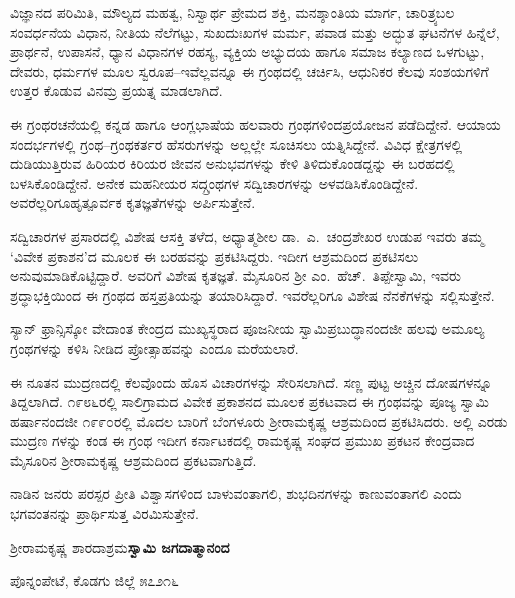 ವಿಜ್ಞಾನದ ಪರಿಮಿತಿ, ಮೌಲ್ಯದ ಮಹತ್ವ, ನಿಸ್ವಾರ್ಥ ಪ್ರೇಮದ ಶಕ್ತಿ, ಮನಶ್ಶಾಂತಿಯ ಮಾರ್ಗ, ಚಾರಿತ್ರ್ಯಬಲ ಸಂವರ್ಧನೆಯ ವಿಧಾನ, ನೀತಿಯ ನೆಲೆಗಟ್ಟು, ಸುಖದುಃಖಗಳ ಮರ್ಮ, ಪವಾಡ ಮತ್ತು ಅದ್ಭುತ ಘಟನೆಗಳ ಹಿನ್ನೆಲೆ, ಪ್ರಾರ್ಥನೆ, ಉಪಾಸನೆ, ಧ್ಯಾನ ವಿಧಾನಗಳ ರಹಸ್ಯ, ವ್ಯಕ್ತಿಯ ಅಭ್ಯುದಯ ಹಾಗೂ ಸಮಾಜ ಕಲ್ಯಾಣದ ಒಳಗುಟ್ಟು, ದೇವರು, ಧರ್ಮಗಳ ಮೂಲ ಸ್ವರೂಪ–ಇವೆಲ್ಲವನ್ನೂ ಈ ಗ್ರಂಥದಲ್ಲಿ ಚರ್ಚಿಸಿ, ಆಧುನಿಕರ ಕೆಲವು ಸಂಶಯಗಳಿಗೆ ಉತ್ತರ ಕೊಡುವ ವಿನಮ್ರ ಪ್ರಯತ್ನ ಮಾಡಲಾಗಿದೆ.

ಈ ಗ್ರಂಥರಚನೆಯಲ್ಲಿ ಕನ್ನಡ ಹಾಗೂ ಆಂಗ್ಲಭಾಷೆಯ ಹಲವಾರು ಗ್ರಂಥಗಳಿಂದ\break ಪ್ರಯೋಜನ ಪಡೆದಿದ್ದೇನೆ. ಆಯಾಯ ಸಂದರ್ಭಗಳಲ್ಲಿ ಗ್ರಂಥ–ಗ್ರಂಥಕರ್ತರ ಹೆಸರುಗಳನ್ನು ಅಲ್ಲಲ್ಲೇ ಸೂಚಿಸಲು ಯತ್ನಿಸಿದ್ದೇನೆ. ವಿವಿಧ ಕ್ಷೇತ್ರಗಳಲ್ಲಿ ದುಡಿಯುತ್ತಿರುವ ಹಿರಿಯರ ಕಿರಿಯರ ಜೀವನ ಅನುಭವಗಳನ್ನು ಕೇಳಿ ತಿಳಿದುಕೊಂಡದ್ದನ್ನು ಈ ಬರಹದಲ್ಲಿ ಬಳಸಿಕೊಂಡಿದ್ದೇನೆ. ಅನೇಕ ಮಹನೀಯರ ಸದ್ಗ್ರಂಥಗಳ ಸದ್ವಿಚಾರಗಳನ್ನು ಅಳವಡಿಸಿಕೊಂಡಿದ್ದೇನೆ. ಅವರೆಲ್ಲರಿಗೂ\break ಹೃತ್ಪೂರ್ವಕ ಕೃತಜ್ಞತೆಗಳನ್ನು ಅರ್ಪಿಸುತ್ತೇನೆ.

ಸದ್ವಿಚಾರಗಳ ಪ್ರಸಾರದಲ್ಲಿ ವಿಶೇಷ ಆಸಕ್ತಿ ತಳೆದ, ಅಧ್ಯಾತ್ಮಶೀಲ ಡಾ.\ ಎ.\ ಚಂದ್ರಶೇಖರ ಉಡುಪ ಇವರು ತಮ್ಮ ‘ವಿವೇಕ ಪ್ರಕಾಶನ’ದ ಮೂಲಕ ಈ ಬರಹವನ್ನು ಪ್ರಕಟಿಸಿದ್ದರು. ಇದೀಗ ಆಶ್ರಮದಿಂದ ಪ್ರಕಟಿಸಲು ಅನುವುಮಾಡಿಕೊಟ್ಟಿದ್ದಾರೆ. ಅವರಿಗೆ ವಿಶೇಷ ಕೃತಜ್ಞತೆ. ಮೈಸೂರಿನ ಶ‍್ರೀ ಎಂ.\ ಹೆಚ್.\ ತಿಪ್ಪೇಸ್ವಾಮಿ, ಇವರು ಶ್ರದ್ಧಾಭಕ್ತಿಯಿಂದ ಈ ಗ್ರಂಥದ ಹಸ್ತಪ್ರತಿಯನ್ನು ತಯಾರಿಸಿದ್ದಾರೆ. ಇವರೆಲ್ಲರಿಗೂ ವಿಶೇಷ ನೆನಕೆಗಳನ್ನು ಸಲ್ಲಿಸುತ್ತೇನೆ.

ಸ್ಯಾನ್ ಫ್ರಾನ್ಸಿಸ್ಕೋ ವೇದಾಂತ ಕೇಂದ್ರದ ಮುಖ್ಯಸ್ಥರಾದ ಪೂಜನೀಯ ಸ್ವಾಮಿ\break ಪ್ರಬುದ್ಧಾನಂದಜೀ ಹಲವು ಅಮೂಲ್ಯ ಗ್ರಂಥಗಳನ್ನು ಕಳಿಸಿ ನೀಡಿದ ಪ್ರೋತ್ಸಾಹವನ್ನು ಎಂದೂ ಮರೆಯಲಾರೆ.

ಈ ನೂತನ ಮುದ್ರಣದಲ್ಲಿ ಕೆಲವೊಂದು ಹೊಸ ವಿಚಾರಗಳನ್ನು ಸೇರಿಸಲಾಗಿದೆ. ಸಣ್ಣ ಪುಟ್ಟ ಅಚ್ಚಿನ ದೋಷಗಳನ್ನೂ ತಿದ್ದಲಾಗಿದೆ. ೧೯೮೬ರಲ್ಲಿ ಸಾಲಿಗ್ರಾಮದ ವಿವೇಕ ಪ್ರಕಾಶನದ ಮೂಲಕ ಪ್ರಕಟವಾದ ಈ ಗ್ರಂಥವನ್ನು ಪೂಜ್ಯ ಸ್ವಾಮಿ ಹರ್ಷಾನಂದಜೀ ೧೯೯೦ರಲ್ಲಿ ಮೊದಲ ಬಾರಿಗೆ ಬೆಂಗಳೂರು ಶ‍್ರೀರಾಮಕೃಷ್ಣ ಆಶ್ರಮದಿಂದ ಪ್ರಕಟಿಸಿದರು. ಅಲ್ಲಿ ಎರಡು ಮುದ್ರಣ ಗಳನ್ನು ಕಂಡ ಈ ಗ್ರಂಥ ಇದೀಗ ಕರ್ನಾಟಕದಲ್ಲಿ ರಾಮಕೃಷ್ಣ ಸಂಘದ ಪ್ರಮುಖ ಪ್ರಕಟನ ಕೇಂದ್ರವಾದ ಮೈಸೂರಿನ ಶ‍್ರೀರಾಮಕೃಷ್ಣ ಆಶ್ರಮದಿಂದ ಪ್ರಕಟವಾಗುತ್ತಿದೆ.

ನಾಡಿನ ಜನರು ಪರಸ್ಪರ ಪ್ರೀತಿ ವಿಶ್ವಾಸಗಳಿಂದ ಬಾಳುವಂತಾಗಲಿ, ಶುಭದಿನಗಳನ್ನು ಕಾಣು\-ವಂತಾಗಲಿ ಎಂದು ಭಗವಂತನನ್ನು ಪ್ರಾರ್ಥಿಸುತ್ತ ವಿರಮಿಸುತ್ತೇನೆ.

\bigskip

\noindent ಶ‍್ರೀರಾಮಕೃಷ್ಣ ಶಾರದಾಶ್ರಮ\hfill \textbf{ಸ್ವಾಮಿ ಜಗದಾತ್ಮಾನಂದ}

\noindent ಪೊನ್ನಂಪೇಟೆ, ಕೊಡಗು ಜಿಲ್ಲೆ ೫೭೨೧೬

